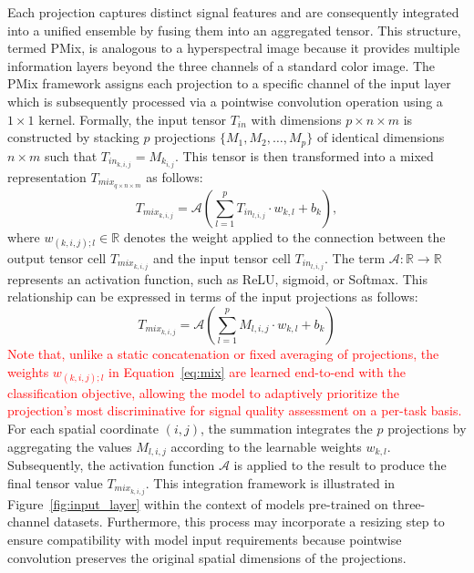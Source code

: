 \documentclass[final,3p,times,twocolumn]{elsarticle}
\newcommand{\red}[1]{\textcolor{red}{#1}}
\begin{document}
Each projection captures distinct signal features and are consequently integrated into a unified ensemble by fusing them into an aggregated tensor. This structure, termed \gls{PMix}, is analogous to a hyperspectral image because it provides multiple information layers beyond the three channels of a standard color image. The \gls{PMix} framework assigns each projection to a specific channel of the input layer which is subsequently processed via a pointwise convolution operation using a $1 \times 1$ kernel. Formally, the input tensor $T_{in}$ with dimensions $p \times n \times m$ is constructed by stacking $p$ projections $\{M_1, M_2, \dots, M_p\}$ of identical dimensions $n \times m$ such that $T_{in_{k,i,j}} = M_{k_{i,j}}$. This tensor is then transformed into a mixed representation $T_{mix_{q \times n \times m}}$ as follows:
\begin{equation}
    T_{mix_{k,i,j}} = \mathcal{A}\left(\sum_{l=1}^{p} T_{in_{l,i,j}} \cdot w_{k,l} + b_k\right),
\end{equation}
where $w_{(k,i,j);l} \in \mathbb{R}$ denotes the weight applied to the connection between the output tensor cell $T_{mix_{k,i,j}}$ and the input tensor cell $T_{in_{l,i,j}}$. The term $\mathcal{A}: \mathbb{R} \to \mathbb{R}$ represents an activation function, such as ReLU, sigmoid, or Softmax. This relationship can be expressed in terms of the input projections as follows:
\begin{equation}
    \label{eq:mix}
    T_{mix_{k,i,j}} = \mathcal{A}\left(\sum_{l=1}^{p} M_{l,i,j} \cdot w_{k,l} + b_k\right)
\end{equation}
\red{Note that, unlike a static concatenation or fixed averaging of projections, the weights $w_{(k,i,j);l}$ in Equation~\ref{eq:mix} are learned end-to-end with the classification objective, allowing the model to adaptively prioritize the projection's most discriminative for signal quality assessment on a per-task basis.}
For each spatial coordinate $(i,j)$, the summation integrates the $p$ projections by aggregating the values $M_{l,i,j}$ according to the learnable weights $w_{k,l}$.
Subsequently, the activation function $\mathcal{A}$ is applied to the result to produce the final tensor value $T_{mix_{k,i,j}}$.
This integration framework is illustrated in Figure~\ref{fig:input_layer} within the context of models pre-trained on three-channel datasets.
Furthermore, this process may incorporate a resizing step to ensure compatibility with model input requirements because pointwise convolution preserves the original spatial dimensions of the projections.
\end{document}
